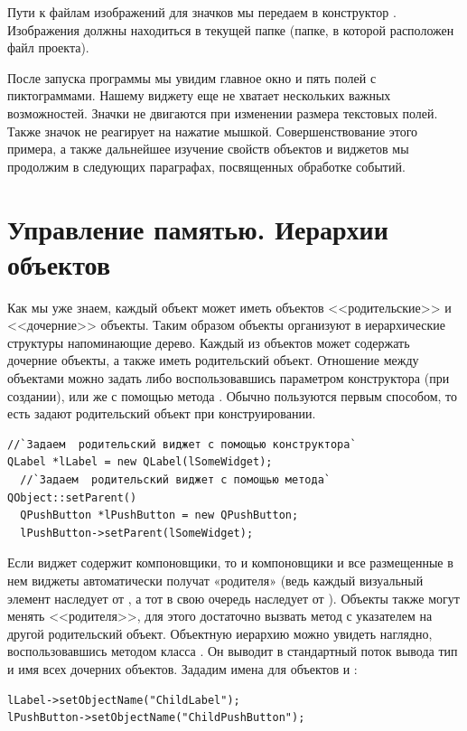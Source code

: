 Пути к файлам изображений для значков мы передаем в конструктор . Изображения
должны находиться в текущей папке (папке, в которой расположен файл проекта).

После запуска программы мы увидим главное окно и пять полей с пиктограммами. Нашему виджету еще не хватает нескольких
важных возможностей. Значки не двигаются при изменении размера текстовых полей. Также значок не реагирует на нажатие
мышкой. Совершенствование этого примера, а также дальнейшее изучение свойств объектов и виджетов мы продолжим в
следующих параграфах, посвященных обработке событий.

\section[Управление памятью. Иерархии объектов]{Управление памятью. Иерархии объектов}
Как мы уже знаем, каждый объект может иметь объектов <<родительские>> и <<дочерние>> объекты.
Таким образом объекты организуют в иерархические структуры напоминающие дерево. Каждый из объектов может содержать
дочерние объекты, а также иметь родительский объект. Отношение между объектами можно задать либо воспользовавшись
параметром конструктора (при создании), или же с помощью метода . Обычно пользуются первым
способом, то есть задают родительский объект при конструировании.
\begin{lstlisting}
//`Задаем  родительский виджет с помощью конструктора`
QLabel *lLabel = new QLabel(lSomeWidget);
  //`Задаем  родительский виджет с помощью метода` QObject::setParent()
  QPushButton *lPushButton = new QPushButton;
  lPushButton->setParent(lSomeWidget);
\end{lstlisting}

Если виджет содержит компоновщики, то и компоновщики и все размещенные в нем виджеты автоматически получат «родителя»
(ведь каждый визуальный элемент наследует от , а тот в свою очередь наследует от
). Объекты также могут менять <<родителя>>, для этого достаточно
вызвать метод  с указателем на другой родительский объект. Объектную иерархию можно увидеть наглядно, воспользовавшись методом  класса
. Он выводит в стандартный поток вывода тип и имя всех дочерних объектов. Зададим имена для объектов
 и :
\begin{lstlisting}
lLabel->setObjectName("ChildLabel");
lPushButton->setObjectName("ChildPushButton");
\end{lstlisting}

